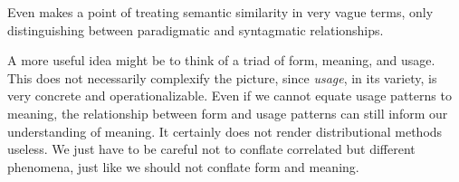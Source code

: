\documentclass[
]{book}
\begin{document}
Even \textcite{sahlgren_2006} makes a point of treating semantic similarity in very vague terms,
only distinguishing between paradigmatic and syntagmatic relationships.

A more useful idea might be to think of a triad of form, meaning, and usage. This
does not necessarily complexify the picture, since \emph{usage}, in its variety, is very
concrete and operationalizable. Even if we cannot equate usage patterns to meaning,
the relationship between form and usage patterns can still inform our understanding of
meaning. It certainly does not render distributional methods useless. We just have
to be careful not to conflate correlated but different phenomena, just like we should
not conflate form and meaning.

\printbibliography
\end{document}
